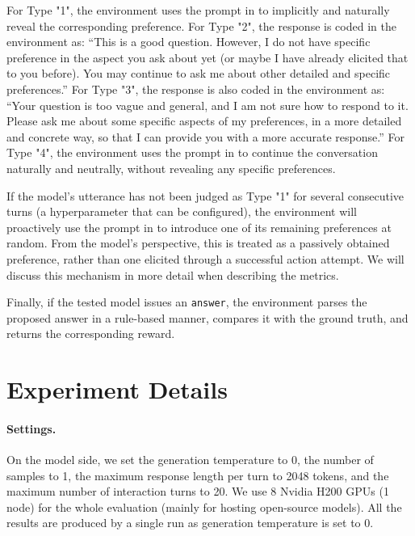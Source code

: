 For Type "1", the environment uses the prompt in  to implicitly and naturally reveal the corresponding preference.  
For Type "2", the response is coded in the environment as: ``This is a good question. However, I do not have specific preference in the aspect you ask about yet (or maybe I have already elicited that to you before). You may continue to ask me about other detailed and specific preferences.''  
For Type "3", the response is also coded in the environment as: ``Your question is too vague and general, and I am not sure how to respond to it. Please ask me about some specific aspects of my preferences, in a more detailed and concrete way, so that I can provide you with a more accurate response.''  
For Type "4", the environment uses the prompt in  to continue the conversation naturally and neutrally, without revealing any specific preferences.

If the model's utterance has not been judged as Type "1" for several consecutive turns (a hyperparameter that can be configured), the environment will proactively use the prompt in  to introduce one of its remaining preferences at random. From the model’s perspective, this is treated as a passively obtained preference, rather than one elicited through a successful action attempt. We will discuss this mechanism in more detail when describing the metrics.

Finally, if the tested model issues an \texttt{answer}, the environment parses the proposed answer in a rule-based manner, compares it with the ground truth, and returns the corresponding reward.


\section{Experiment Details}
\label{sec:apdx_exp_setting}

\paragraph{Settings.} On the model side, we set the generation temperature to 0, the number of samples to 1, the maximum response length per turn to 2048 tokens, and the maximum number of interaction turns to 20. We use 8 Nvidia H200 GPUs (1 node) for the whole evaluation (mainly for hosting open-source models). All the results are produced by a single run as generation temperature is set to 0.

